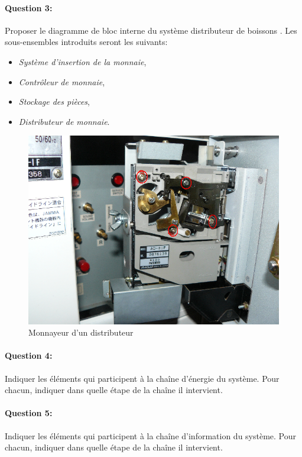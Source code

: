 \paragraph{Question 3:}

Proposer le diagramme de bloc interne du système \og distributeur de boissons \fg. Les sous-ensembles introduits seront les suivants:
\begin{itemize}
 \item \textit{Système d'insertion de la monnaie},
 \item \textit{Contrôleur de monnaie},
 \item \textit{Stockage des pièces},
 \item \textit{Distributeur de monnaie}.
\end{itemize}

\newpage

\begin{figure}[htbp]
\begin{center}
\includegraphics[width=0.8\linewidth]{img/monnayeur.png}
\caption{Monnayeur d'un distributeur}
\label{fig:image108}
\end{center}
\end{figure}

\paragraph{Question 4:}
Indiquer les éléments qui participent à la chaîne d'énergie du système. Pour chacun, indiquer dans quelle étape de la chaîne il intervient.

\paragraph{Question 5:}
Indiquer les éléments qui participent à la chaîne d'information du système. Pour chacun, indiquer dans quelle étape de la chaîne il intervient.


